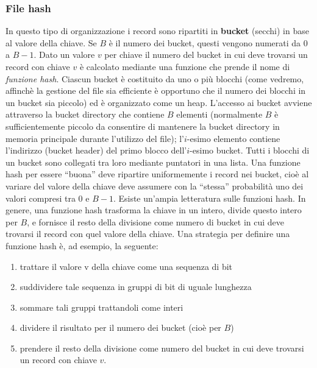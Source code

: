 \subsubsection{File hash}
In questo tipo di organizzazione i record sono ripartiti in \textbf{bucket} (secchi) in base al valore della
chiave. Se $B$ è il numero dei bucket, questi vengono numerati da $0$ a $B-1$. Dato un valore $v$ per
chiave il numero del bucket in cui deve trovarsi un record con chiave $v$ è calcolato mediante una
funzione che prende il nome di \emph{funzione hash}.
Ciascun bucket è costituito da uno o più blocchi (come vedremo, affinchè la gestione del file sia
efficiente è opportuno che il numero dei blocchi in un bucket sia piccolo) ed è organizzato come un
heap. L'accesso ai bucket avviene attraverso la bucket directory che contiene $B$ elementi
(normalmente $B$ è sufficientemente piccolo da consentire di mantenere la bucket directory in
memoria principale durante l'utilizzo del file); l'$i$-esimo elemento contiene l'indirizzo (bucket
header) del primo blocco dell'$i$-esimo bucket. Tutti i blocchi di un bucket sono collegati tra loro
mediante puntatori in una lista.
Una funzione hash per essere ``buona'' deve ripartire uniformemente i record nei bucket, cioè al
variare del valore della chiave deve assumere con la ``stessa'' probabilità uno dei valori compresi tra
$0$ e $B-1$. Esiste un'ampia letteratura sulle funzioni hash. In genere, una funzione hash trasforma la
chiave in un intero, divide questo intero per $B$, e fornisce il resto della divisione come numero di
bucket in cui deve trovarsi il record con quel valore della chiave. Una strategia per definire una
funzione hash è, ad esempio, la seguente:
\begin{enumerate}
 \item trattare il valore v della chiave come una sequenza di bit
 \item suddividere tale sequenza in gruppi di bit di uguale lunghezza
 \item sommare tali gruppi trattandoli come interi
 \item dividere il risultato per il numero dei bucket (cioè per $B$)
 \item prendere il resto della divisione come numero del bucket in cui deve trovarsi un record con
chiave $v$.
\end{enumerate}

